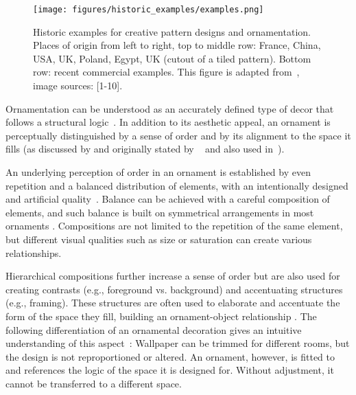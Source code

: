 \begin{figure}
       \texttt{[image: figures/historic\_examples/examples.png]}
        \caption[Historic pattern examples]{\label{fig:historic_examples} Historic examples for creative pattern designs and ornamentation. Places of origin from left to right, top to middle row:  France, China, USA, UK, Poland, Egypt, UK (cutout of a tiled pattern). Bottom row: recent commercial examples. This figure is adapted from~\cite{gieseke_2017_ooo}, image sources: [1-10].}
\end{figure}

Ornamentation can be understood as an accurately defined type of decor that follows a structural logic~\cite{ward_1896_tpo, moughtin_1999_udo, arbruzzo_2006_dec}. 
In addition to its aesthetic appeal, an ornament is perceptually distinguished by a sense of order and by its alignment to the space it fills (as discussed by \cite{wong_1998_cgf,gieseke_2017_ooo} and originally stated by \citeauthor*{ward_1896_tpo}~\cite{ward_1896_tpo} and also used in~\cite{dresser_1875_pdd, arbruzzo_2006_dec}). 


An underlying perception of order in an ornament is established by even repetition and a balanced distribution of elements, with an intentionally designed and artificial quality~\cite{ward_1896_tpo}. Balance can be achieved with a careful composition of elements, and such balance is built on symmetrical arrangements in most ornaments \cite{gieseke_2017_ooo}. Compositions are not limited to the repetition of the same element, but different visual qualities such as size or saturation can create various relationships. 


Hierarchical compositions further increase a sense of order but are also used for creating contrasts (e.g., foreground vs. background) and accentuating structures (e.g., framing). These structures are often used to elaborate and accentuate the form of the space they fill, building an ornament-object relationship \cite{arbruzzo_2006_dec}. The following differentiation of an ornamental decoration gives an intuitive understanding of this aspect~\cite{arbruzzo_2006_dec}: Wallpaper can be trimmed for different rooms, but the design is not reproportioned or altered. An ornament, however, is fitted to and references the logic of the space it is designed for. Without adjustment, it cannot be transferred to a different space.

